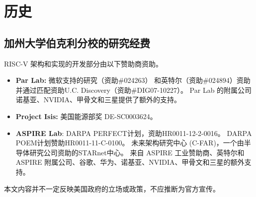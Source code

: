 \chapter{历史
}

\section{ 加州大学伯克利分校的研究经费
}

RISC-V 架构和实现的开发部分由以下赞助商资助。

\begin{itemize}
\item {\bf Par Lab:} 微软支持的研究（资助\#024263）
  和英特尔（资助\#024894）资助并通过匹配资助U.C. Discovery（资助\#DIG07-10227）。
  Par Lab 的附属公司诺基亚、NVIDIA、甲骨文和三星提供了额外的支持。

\item {\bf Project Isis:} 美国能源部奖 DE-SC0003624。

\item {\bf ASPIRE Lab}: DARPA PERFECT计划，资助HR0011-12-2-0016。
DARPA POEM计划赞助HR0011-11-C-0100。 
未来架构研究中心 (C-FAR)，一个由半导体研究公司资助的STARnet中心。 
来自 ASPIRE 工业赞助商、英特尔和 ASPIRE 附属公司、谷歌、华为、诺基亚、NVIDIA、甲骨文和三星的额外支持。

\end{itemize}

本文内容并不一定反映美国政府的立场或政策，不应推断为官方宣传。



